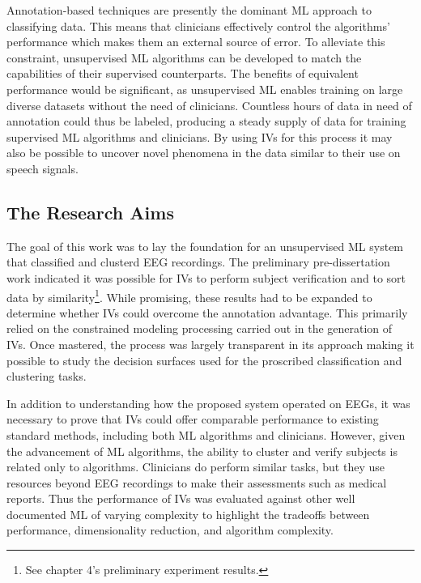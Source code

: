 Annotation-based techniques are presently the dominant \ac{ML} approach to classifying data. This means that clinicians effectively control the algorithms' performance which makes them an external source of error. To alleviate this constraint, unsupervised \ac{ML} algorithms can be developed to match the capabilities of their supervised counterparts. The benefits of equivalent performance would be significant, as unsupervised \ac{ML} enables training on large diverse datasets without the need of clinicians. Countless hours of data in need of annotation could thus be labeled, producing a steady supply of data for training supervised \ac{ML} algorithms and clinicians. By using \acp{IV} for this process it may also be possible to uncover novel phenomena in the data similar to their use on speech signals.

\subsection{The Research Aims}

The goal of this work was to lay the foundation for an unsupervised \ac{ML} system that classified and clusterd \ac{EEG} recordings. The preliminary pre-dissertation work indicated it was possible for \acp{IV} to perform subject verification and to sort data by similarity\footnote{See chapter 4's preliminary experiment results.}. While promising, these results had to be expanded to determine whether \acp{IV} could overcome the annotation advantage. This primarily relied on the constrained modeling processing carried out in the generation of \acp{IV}. Once mastered, the process was largely transparent in its approach making it possible to study the decision surfaces used for the proscribed classification and clustering tasks.

In addition to understanding how the proposed system operated on \acp{EEG}, it was necessary to prove that \acp{IV} could offer comparable performance to existing standard methods, including both \ac{ML} algorithms and clinicians. However, given the advancement of \ac{ML} algorithms, the ability to cluster and verify subjects is related only to algorithms. Clinicians do perform similar tasks, but they use resources beyond \ac{EEG} recordings to make their assessments such as medical reports. Thus the performance of \acp{IV} was evaluated against other well documented \ac{ML} of varying complexity to highlight the tradeoffs between performance, dimensionality reduction, and algorithm complexity.

